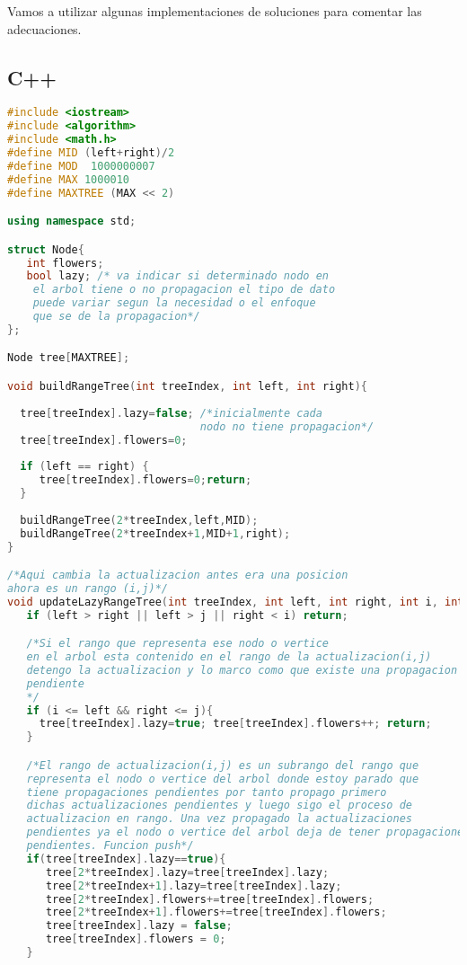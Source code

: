 Vamos a utilizar algunas implementaciones de soluciones para comentar las adecuaciones.

\subsection{C++}

\begin{lstlisting}[language=C++]
#include <iostream>
#include <algorithm>
#include <math.h>
#define MID (left+right)/2
#define MOD  1000000007
#define MAX 1000010
#define MAXTREE (MAX << 2)

using namespace std;

struct Node{
   int flowers;
   bool lazy; /* va indicar si determinado nodo en 
	el arbol tiene o no propagacion el tipo de dato 
	puede variar segun la necesidad o el enfoque 
	que se de la propagacion*/
};

Node tree[MAXTREE];

void buildRangeTree(int treeIndex, int left, int right){
	
  tree[treeIndex].lazy=false; /*inicialmente cada 
                              nodo no tiene propagacion*/
  tree[treeIndex].flowers=0;
	
  if (left == right) {
     tree[treeIndex].flowers=0;return;
  }
	
  buildRangeTree(2*treeIndex,left,MID);
  buildRangeTree(2*treeIndex+1,MID+1,right);
}

/*Aqui cambia la actualizacion antes era una posicion 
ahora es un rango (i,j)*/
void updateLazyRangeTree(int treeIndex, int left, int right, int i, int j){
   if (left > right || left > j || right < i) return;

   /*Si el rango que representa ese nodo o vertice 
   en el arbol esta contenido en el rango de la actualizacion(i,j)  
   detengo la actualizacion y lo marco como que existe una propagacion 
   pendiente
   */	
   if (i <= left && right <= j){  
     tree[treeIndex].lazy=true; tree[treeIndex].flowers++; return;
   }

   /*El rango de actualizacion(i,j) es un subrango del rango que 
   representa el nodo o vertice del arbol donde estoy parado que 
   tiene propagaciones pendientes por tanto propago primero 
   dichas actualizaciones pendientes y luego sigo el proceso de
   actualizacion en rango. Una vez propagado la actualizaciones
   pendientes ya el nodo o vertice del arbol deja de tener propagaciones
   pendientes. Funcion push*/	
   if(tree[treeIndex].lazy==true){
      tree[2*treeIndex].lazy=tree[treeIndex].lazy;
      tree[2*treeIndex+1].lazy=tree[treeIndex].lazy;
      tree[2*treeIndex].flowers+=tree[treeIndex].flowers;
      tree[2*treeIndex+1].flowers+=tree[treeIndex].flowers;
      tree[treeIndex].lazy = false;
      tree[treeIndex].flowers = 0;
   }
	

\end{lstlisting}
